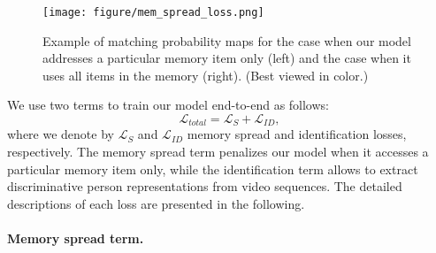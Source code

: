 \documentclass[10pt,twocolumn,letterpaper]{article}
\begin{document}
		\begin{figure}
			\centering
			\texttt{[image: figure/mem\_spread\_loss.png]}
			\caption{Example of matching probability maps for the case when our model addresses a particular memory item only (left) and the case when it uses all items in the memory (right). (Best viewed in color.)}
			\label{fig:mem_spread_loss}
			\vspace{-0.6cm}
		\end{figure}
	
		We use two terms to train our model end-to-end as follows:
			\begin{equation}
				\mathcal{L}_{total}	= \mathcal{L}_{S} + \mathcal{L}_{ID},
			\end{equation}
		where we denote by $\mathcal{L}_{S}$ and $\mathcal{L}_{ID}$ memory spread and identification losses, respectively. The memory spread term penalizes our model when it accesses a particular memory item only, while the identification term allows to extract discriminative person representations from video sequences. The detailed descriptions of each loss are presented in the following.
		
		\vspace{-0.4cm}
		\paragraph{Memory spread term.}
		
\end{document}
